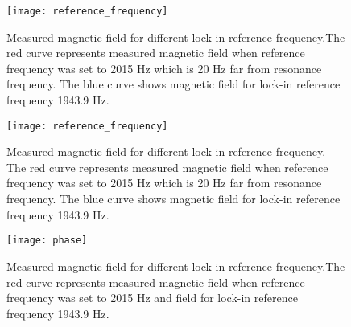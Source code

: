 \documentclass[12pt]{report}
\begin{document}
\begin{figure}[h]
\centering\texttt{[image: reference\_frequency]}
\caption{Measured magnetic field for different lock-in reference frequency.The red curve represents measured magnetic field when reference frequency was set to 2015 Hz which is 20 Hz far from resonance frequency. The blue curve shows magnetic field for lock-in reference frequency 1943.9 Hz.}
\end{figure}
\begin{figure}[h]
\centering\texttt{[image: reference\_frequency]}
\caption{Measured magnetic field for different lock-in reference frequency. The red curve represents measured magnetic field when reference frequency was set to 2015 Hz which is 20 Hz far from resonance frequency. The blue curve shows magnetic field for lock-in reference frequency 1943.9 Hz.}
\end{figure}
\begin{figure}[h]
\centering\texttt{[image: phase]}
\caption{Measured magnetic field for different lock-in reference frequency.The red curve represents measured magnetic field when reference frequency was set to 2015 Hz and field for lock-in reference frequency 1943.9 Hz.}
\end{figure}
\newpage
\end{document}
